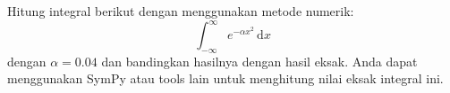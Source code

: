 \documentclass[12pt]{article}
\begin{document}
\thispagestyle{empty}

Hitung integral berikut dengan menggunakan metode numerik:
$$
\int_{-\infty}^{\infty} e^{-\alpha x^2}\,\mathrm{d}x
$$
dengan $\alpha = 0.04$
dan bandingkan hasilnya dengan hasil eksak. Anda dapat menggunakan SymPy
atau tools lain untuk menghitung nilai eksak integral ini.
\end{document}
